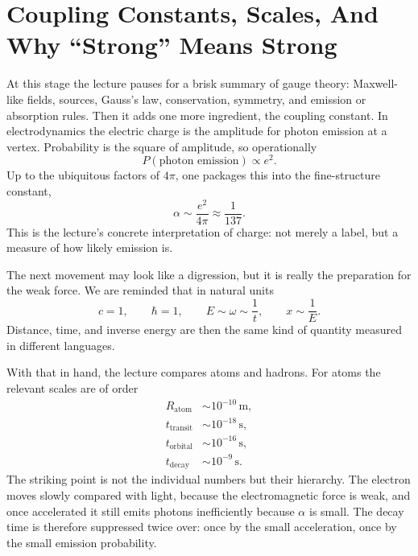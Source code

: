 \section{Coupling Constants, Scales, And Why ``Strong'' Means Strong}

At this stage the lecture pauses for a brisk summary of gauge theory: Maxwell-like fields, sources, Gauss's law, conservation, symmetry, and emission or absorption rules. Then it adds one more ingredient, the coupling constant. In electrodynamics the electric charge is the amplitude for photon emission at a vertex. Probability is the square of amplitude, so operationally
\begin{equation}
P(\text{photon emission}) \propto e^2.
\end{equation}
Up to the ubiquitous factors of \(4\pi\), one packages this into the fine-structure constant,
\begin{equation}
\alpha \sim \frac{e^2}{4\pi}\approx \frac{1}{137}.
\end{equation}
This is the lecture's concrete interpretation of charge: not merely a label, but a measure of how likely emission is.

The next movement may look like a digression, but it is really the preparation for the weak force. We are reminded that in natural units
\begin{equation}
c=1,
\qquad
\hbar=1,
\qquad
E\sim \omega \sim \frac{1}{t},
\qquad
x\sim \frac{1}{E}.
\end{equation}
Distance, time, and inverse energy are then the same kind of quantity measured in different languages.

With that in hand, the lecture compares atoms and hadrons. For atoms the relevant scales are of order
\begin{align}
R_{\text{atom}} &\sim 10^{-10}\,\mathrm m,\\
t_{\text{transit}} &\sim 10^{-18}\,\mathrm s,\\
t_{\text{orbital}} &\sim 10^{-16}\,\mathrm s,\\
t_{\text{decay}} &\sim 10^{-9}\,\mathrm s.
\end{align}
The striking point is not the individual numbers but their hierarchy. The electron moves slowly compared with light, because the electromagnetic force is weak, and once accelerated it still emits photons inefficiently because \(\alpha\) is small. The decay time is therefore suppressed twice over: once by the small acceleration, once by the small emission probability.

